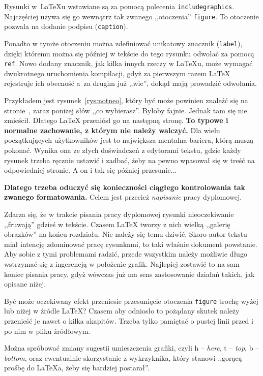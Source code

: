 Rysunki w~\LaTeX{u} wstawiane są za pomocą polecenia \texttt{includegraphics}. Najczęściej używa się go wewnątrz tak zwanego ,,otoczenia'' \texttt{figure}. To otoczenie pozwala na dodanie podpisu (\texttt{caption}).

Ponadto w tymże otoczeniu można zdefiniować unikatowy znacznik (\texttt{label}), dzięki któremu można się później w tekście do tego rysunku odwołać za pomocą \texttt{ref}. Nowo dodany znacznik, jak kilka innych rzeczy w \LaTeX{u}, może wymagać dwukrotnego uruchomienia kompilacji, gdyż za pierwszym razem \LaTeX{} rejestruje ich obecność a~za drugim już ,,wie'', dokąd mają prowadzić odwołania.

Przykładem jest rysunek~\ref{rys:notneo}, który być może powinien znaleźć się na stronie~\pageref{ch:wstep}, zaraz poniżej słów ,,co wybierasz''. Byłoby fajnie. Jednak tam się nie zmieścił. Dlatego \LaTeX{} przeniósł go na następną stronę. \textbf{To typowe i normalne zachowanie, z którym nie należy walczyć.} Dla wielu początkujących użytkowników jest to największa mentalna bariera, którą muszą pokonać. Wynika ona ze złych doświadczeń z edytorami tekstu, gdzie każdy rysunek trzeba ręcznie ustawić i zadbać, żeby na pewno wpasował się w treść na odpowiedniej stronie. A on i tak się później przesunie...

\textbf{Dlatego trzeba oduczyć się konieczności ciągłego kontrolowania tak zwanego formatowania.} Celem jest przecież \textit{napisanie} pracy dyplomowej.

Zdarza się, że w trakcie pisania pracy dyplomowej rysunki nieoczekiwanie ,,fruwają'' gdzieś w tekście. Czasem \LaTeX{} tworzy z nich wielką ,,galerię obrazków'' na końcu rozdziału. Nie należy się temu dziwić. Skoro autor tekstu miał intencję zdominować pracę rysunkami, to taki właśnie dokument powstanie. Aby sobie z tymi problemami radzić, przede wszystkim należy możliwie długo wstrzymać się z ingerencją w położenie grafik. Najlepiej zostawić to na sam koniec pisania pracy, gdyż wówczas już ma sens zastosowanie działań takich, jak opisane niżej.

Być może oczekiwany efekt przeniesie przesunięcie otoczenia \texttt{figure} trochę wyżej lub niżej w źródle \LaTeX{}? Czasem aby odniosło to pożądany skutek należy przenieść je nawet o kilka akapitów. Trzeba tylko pamiętać o pustej linii przed i po nim w pliku źródłowym.

Można spróbować zmiany sugestii umieszczenia grafiki, czyli h -- \textit{here}, t -- \textit{top}, b -- \textit{bottom}, oraz ewentualnie skorzystanie z wykrzyknika, który stanowi ,,gorącą prośbę do \LaTeX{a}, żeby się bardziej postarał''.

